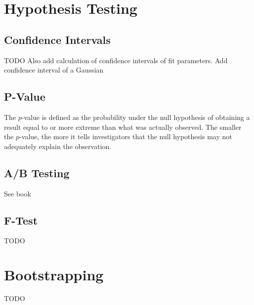 \section{Hypothesis Testing}

\subsection{Confidence Intervals}
TODO
Also add calculation of confidence intervals of fit parameters.
Add confidence interval of a Gaussian

\subsection{P-Value}
The $p$-value is defined as the probability under the null hypothesis of obtaining a result equal to or more extreme than what was actually observed. The smaller the $p$-value, the more it tells investigators that the null hypothesis may not adequately explain the observation.


\subsection{A/B Testing}
See book \cite{grus}


\subsection{F-Test}
TODO

\section{Bootstrapping}
TODO


